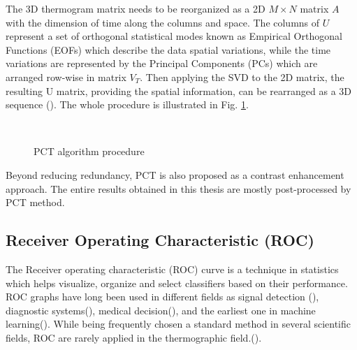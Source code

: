 The 3D thermogram matrix needs to be reorganized as a 2D $M\times N$ matrix $A$ with the dimension of time along the columns and space. The columns of $U$ represent a set of orthogonal statistical modes known as Empirical Orthogonal Functions (EOFs) which describe the data spatial variations, while the time variations are represented by the Principal Components (PCs) which are arranged row-wise in matrix $V_T$. Then applying the SVD to the 2D matrix, the resulting U matrix, providing the spatial information, can be rearranged as a 3D sequence (\citet{Ibarra-Castanedo2006}). The whole procedure is illustrated in Fig. \ref{PCT_SVD}.
\begin{figure}[htbp]
	\centering
	\\
	\caption{PCT algorithm procedure}
	\label{PCT_SVD}
\end{figure}

Beyond reducing redundancy, PCT is also proposed as a contrast enhancement approach.
The entire results obtained in this thesis are mostly post-processed by PCT method.

\subsection{Receiver Operating 	Characteristic (ROC)}
The Receiver operating characteristic (ROC) curve is a technique in statistics which helps visualize, organize and select classifiers based on their performance. ROC graphs have long been used in different fields as signal detection (\citet{swets2000better}), diagnostic systems(\citet{swets1988measuring}), medical decision(\citet{zou2002receiver}), and the earliest one in machine learning(\citet{spackman1989signal}). While being frequently chosen a standard method in several scientific fields, ROC are rarely applied in the thermographic field.(\citet{Bison2014a}).

